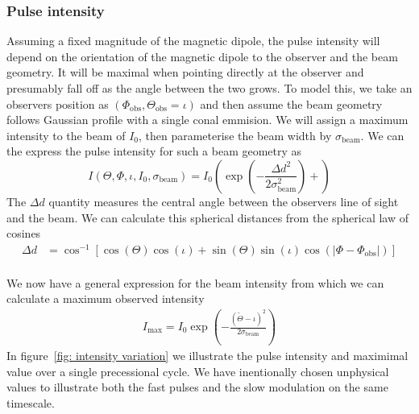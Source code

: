 \documentclass[/home/greg/Thesis/main/main.tex]{subfiles}
\begin{document}
\graphicspath{{/home/greg/Neutron_star_modelling/BeamwidthCalculation/img/}}

\newcommand{\ThetaO}{\Theta_{\mathrm{obs}}}
\newcommand{\PhiO}{\Phi_{\mathrm{obs}}}
\newcommand{\sigmaB}{\sigma_{\textrm{beam}}}
\newcommand{\Imax}{I_{\textrm{max}}}
\newcommand{\ThetaT}{\tilde{\Theta}}

\subsubsection{Pulse intensity}

Assuming a fixed magnitude of the magnetic dipole, the pulse intensity will
depend on the orientation of the magnetic dipole to the observer and the beam
geometry. It will be maximal when pointing directly at the observer and
presumably fall off as the angle between the two grows. To model this, we take
an observers position as $(\PhiO, \ThetaO=\iota)$ and then assume the beam geometry
follows Gaussian profile with a single conal emmision. We will assign a maximum
intensity to the beam of $I_0$, then parameterise the beam width by $\sigmaB$.
We can the express the pulse intensity for such a beam geometry as
\begin{equation}
I
(\Theta, \Phi, \iota,  I_{0}, \sigmaB)
=
I_{0} \left(
\exp\left(-\frac{\Delta d^{2}}{2\sigmaB^{2}}\right)+
\right)
\label{eqn: beam intensity}
\end{equation}
The $\Delta d$ quantity
measures the central angle between the observers line of sight and the beam.
We can calculate this spherical distances from the spherical law of cosines
\begin{align}
\Delta d &= \cos^{-1}\left[\cos(\Theta)\cos(\iota) +
                              \sin(\Theta)\sin(\iota)\cos(|\Phi - \PhiO|)\right] \\
\label{eqn: angular sep}
\end{align}

We now have a general expression for the beam intensity from which we can calculate
a maximum observed intensity
\newcommand{\repterm}{\left(\ThetaT - \iota\right)^{2}}
\begin{align}
I_\textrm{max} = I_{0} \exp\left(
    -\frac{\repterm}
          {2\sigmaB}\right)
\label{eqn: Imax}
\end{align}
In figure~\ref{fig: intensity variation} we illustrate the pulse intensity and
maximimal value over a single precessional cycle. We have inentionally chosen
unphysical values to illustrate both the fast pulses and the slow modulation on
the same timescale.
\end{document}
